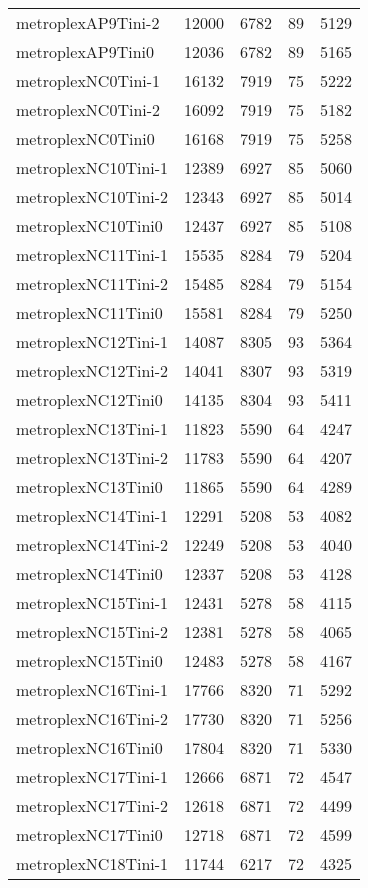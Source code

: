 \begin{longtable}{lrrrr}
metroplexAP9Tini-2 & 12000 & 6782 & 89 & 5129 \\
metroplexAP9Tini0 & 12036 & 6782 & 89 & 5165 \\
metroplexNC0Tini-1 & 16132 & 7919 & 75 & 5222 \\
metroplexNC0Tini-2 & 16092 & 7919 & 75 & 5182 \\
metroplexNC0Tini0 & 16168 & 7919 & 75 & 5258 \\
metroplexNC10Tini-1 & 12389 & 6927 & 85 & 5060 \\
metroplexNC10Tini-2 & 12343 & 6927 & 85 & 5014 \\
metroplexNC10Tini0 & 12437 & 6927 & 85 & 5108 \\
metroplexNC11Tini-1 & 15535 & 8284 & 79 & 5204 \\
metroplexNC11Tini-2 & 15485 & 8284 & 79 & 5154 \\
metroplexNC11Tini0 & 15581 & 8284 & 79 & 5250 \\
metroplexNC12Tini-1 & 14087 & 8305 & 93 & 5364 \\
metroplexNC12Tini-2 & 14041 & 8307 & 93 & 5319 \\
metroplexNC12Tini0 & 14135 & 8304 & 93 & 5411 \\
metroplexNC13Tini-1 & 11823 & 5590 & 64 & 4247 \\
metroplexNC13Tini-2 & 11783 & 5590 & 64 & 4207 \\
metroplexNC13Tini0 & 11865 & 5590 & 64 & 4289 \\
metroplexNC14Tini-1 & 12291 & 5208 & 53 & 4082 \\
metroplexNC14Tini-2 & 12249 & 5208 & 53 & 4040 \\
metroplexNC14Tini0 & 12337 & 5208 & 53 & 4128 \\
metroplexNC15Tini-1 & 12431 & 5278 & 58 & 4115 \\
metroplexNC15Tini-2 & 12381 & 5278 & 58 & 4065 \\
metroplexNC15Tini0 & 12483 & 5278 & 58 & 4167 \\
metroplexNC16Tini-1 & 17766 & 8320 & 71 & 5292 \\
metroplexNC16Tini-2 & 17730 & 8320 & 71 & 5256 \\
metroplexNC16Tini0 & 17804 & 8320 & 71 & 5330 \\
metroplexNC17Tini-1 & 12666 & 6871 & 72 & 4547 \\
metroplexNC17Tini-2 & 12618 & 6871 & 72 & 4499 \\
metroplexNC17Tini0 & 12718 & 6871 & 72 & 4599 \\
metroplexNC18Tini-1 & 11744 & 6217 & 72 & 4325 \\

\end{longtable}
